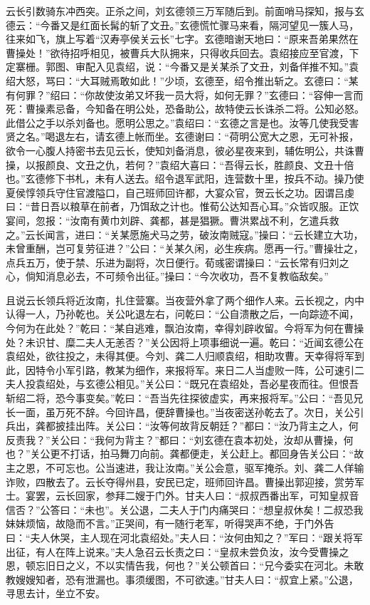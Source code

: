 云长引数骑东冲西突。正杀之间，刘玄德领三万军随后到。前面哨马探知，报与玄德云：“今番又是红面长髯的斩了文丑。”玄德慌忙骤马来看，隔河望见一簇人马，往来如飞，旗上写着“汉寿亭侯关云长”七字。玄德暗谢天地曰：“原来吾弟果然在曹操处！”欲待招呼相见，被曹兵大队拥来，只得收兵回去。袁绍接应至官渡，下定寨栅。郭图、审配入见袁绍，说：“今番又是关某杀了文丑，刘备佯推不知。”袁绍大怒，骂曰：“大耳贼焉敢如此！”少顷，玄德至，绍令推出斩之。玄德曰：“某有何罪？”绍曰：“你故使汝弟又坏我一员大将，如何无罪？”玄德曰：“容伸一言而死：曹操素忌备，今知备在明公处，恐备助公，故特使云长诛杀二将。公知必怒。此借公之手以杀刘备也。愿明公思之。”袁绍曰：“玄德之言是也。汝等几使我受害贤之名。”喝退左右，请玄德上帐而坐。玄德谢曰：“荷明公宽大之恩，无可补报，欲令一心腹人持密书去见云长，使知刘备消息，彼必星夜来到，辅佐明公，共诛曹操，以报颜良、文丑之仇，若何？”袁绍大喜曰：“吾得云长，胜颜良、文丑十倍也。”玄德修下书札，未有人送去。绍令退军武阳，连营数十里，按兵不动。操乃使夏侯惇领兵守住官渡隘口，自己班师回许都，大宴众官，贺云长之功。因谓吕虔曰：“昔日吾以粮草在前者，乃饵敌之计也。惟荀公达知吾心耳。”众皆叹服。正饮宴间，忽报：“汝南有黄巾刘辟、龚都，甚是猖獗。曹洪累战不利，乞遣兵救之。”云长闻言，进曰：“关某愿施犬马之劳，破汝南贼寇。”操曰：“云长建立大功，未曾重酬，岂可复劳征进？”公曰：“关某久闲，必生疾病。愿再一行。”曹操壮之，点兵五万，使于禁、乐进为副将，次日便行。荀彧密谓操曰：“云长常有归刘之心，倘知消息必去，不可频令出征。”操曰：“今次收功，吾不复教临敌矣。”

且说云长领兵将近汝南，扎住营寨。当夜营外拿了两个细作人来。云长视之，内中认得一人，乃孙乾也。关公叱退左右，问乾曰：“公自溃散之后，一向踪迹不闻，今何为在此处？”乾曰：“某自逃难，飘泊汝南，幸得刘辟收留。今将军为何在曹操处？未识甘、糜二夫人无恙否？”关公因将上项事细说一遍。乾曰：“近闻玄德公在袁绍处，欲往投之，未得其便。今刘、龚二人归顺袁绍，相助攻曹。天幸得将军到此，因特令小军引路，教某为细作，来报将军。来日二人当虚败一阵，公可速引二夫人投袁绍处，与玄德公相见。”关公曰：“既兄在袁绍处，吾必星夜而往。但恨吾斩绍二将，恐今事变矣。”乾曰：“吾当先往探彼虚实，再来报将军。”公曰：“吾见兄长一面，虽万死不辞。今回许昌，便辞曹操也。”当夜密送孙乾去了。次日，关公引兵出，龚都披挂出阵。关公曰：“汝等何故背反朝廷？”都曰：“汝乃背主之人，何反责我？”关公曰：“我何为背主？”都曰：“刘玄德在袁本初处，汝却从曹操，何也？”关公更不打话，拍马舞刀向前。龚都便走，关公赶上。都回身告关公曰：“故主之恩，不可忘也。公当速进，我让汝南。”关公会意，驱军掩杀。刘、龚二人佯输诈败，四散去了。云长夺得州县，安民已定，班师回许昌。曹操出郭迎接，赏劳军士。宴罢，云长回家，参拜二嫂于门外。甘夫人曰：“叔叔西番出军，可知皇叔音信否？”公答曰：“未也”。关公退，二夫人于门内痛哭曰：“想皇叔休矣！二叔恐我妹妹烦恼，故隐而不言。”正哭间，有一随行老军，听得哭声不绝，于门外告曰：“夫人休哭，主人现在河北袁绍处。”夫人曰：“汝何由知之？”军曰：“跟关将军出征，有人在阵上说来。”夫人急召云长责之曰：“皇叔未尝负汝，汝今受曹操之恩，顿忘旧日之义，不以实情告我，何也？”关公顿首曰：“兄今委实在河北。未敢教嫂嫂知者，恐有泄漏也。事须缓图，不可欲速。”甘夫人曰：“叔宜上紧。”公退，寻思去计，坐立不安。

